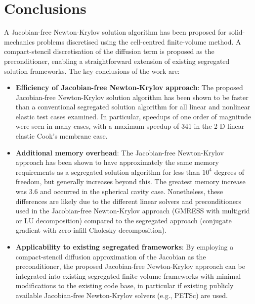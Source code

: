 \documentclass[sn-mathphys,Numbered]{sn-jnl}%
\begin{document}
\section{Conclusions} \label{sec:conclusion}
A Jacobian-free Newton-Krylov solution algorithm has been proposed for solid-mechanics problems discretised using the cell-centred finite-volume method.
A compact-stencil discretisation of the diffusion term is proposed as the preconditioner, enabling a straightforward extension of existing segregated solution frameworks.
The key conclusions of the work are:
\begin{itemize}
	\item \textbf{Efficiency of Jacobian-free Newton-Krylov approach}: The proposed Jacobian-free Newton-Krylov solution algorithm has been shown to be faster than a conventional segregated solution algorithm for all linear and nonlinear elastic test cases examined. In particular, speedups of one order of magnitude were seen in many cases, with a maximum speedup of 341 in the 2-D linear elastic Cook's membrane case.

	\item \textbf{Additional memory overhead}: The Jacobian-free Newton-Krylov approach has been shown to have approximately the same memory requirements as a segregated solution algorithm for less than $10^4$ degrees of freedom, but generally increases beyond this.
	The greatest memory increase was 3.6 and occurred in the spherical cavity case. Nonetheless, these differences are likely due to the different linear solvers and preconditioners used in the Jacobian-free Newton-Krylov approach (GMRESS with multigrid or LU decomposition) compared to the segregated approach (conjugate gradient with zero-infill Cholesky decomposition).
	
	\item \textbf{Applicability to existing segregated frameworks}: By employing a compact-stencil diffusion approximation of the Jacobian as the preconditioner, the proposed Jacobian-free Newton-Krylov approach can be integrated into existing segregated finite volume frameworks with minimal modifications to the existing code base, in particular if existing publicly available Jacobian-free Newton-Krylov solvers (e.g., PETSc) are used.



\end{itemize}
\end{document}
